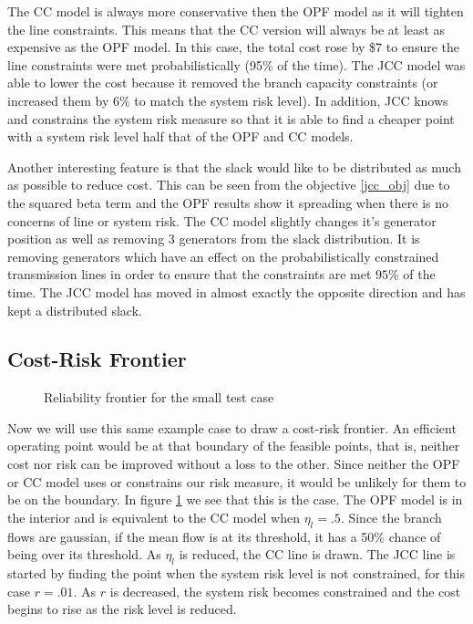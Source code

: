 The CC model is always more conservative then the OPF model as it will tighten the line constraints.  This means that the CC version will always be at least as expensive as the OPF model.  In this case, the total cost rose by \$7 to ensure the line constraints were met probabilistically (95\% of the time).  The JCC model was able to lower the cost because it removed the branch capacity constraints (or increased them by 6\% to match the system risk level).  In addition, JCC knows and constrains the system risk measure so that it is able to find a cheaper point with a system risk level half that of the OPF and CC models.



Another interesting feature is that the slack would like to be distributed as much as possible to reduce cost.  This can be seen from the objective \ref{jcc_obj} due to the squared beta term and the OPF results show it spreading when there is no concerns of line or system risk.  The CC model slightly changes it's generator position as well as removing 3 generators from the slack distribution.  It is removing generators which have an effect on the probabilistically constrained transmission lines in order to ensure that the constraints are met $95\%$ of the time.  The JCC model has moved in almost exactly the opposite direction and has kept a distributed slack.


\subsection{Cost-Risk Frontier}
  \begin{figure} 
\centering

\caption{Reliability frontier for the small test case}\label{costriskfront}
\end{figure}

Now we will use this same example case to draw a cost-risk frontier.  An efficient operating point would be at that boundary of the feasible points, that is, neither cost nor risk can be improved without a loss to the other.  Since neither the OPF or CC model uses or constrains our risk measure, it would be unlikely for them to be on the boundary.  In figure \ref{costriskfront} we see that this is the case.  The OPF model is in the interior and is equivalent to the CC model when $\eta_l=.5$.  Since the branch flows are gaussian, if the mean flow is at its threshold, it has a 50\% chance of being over its threshold.  As $\eta_l$ is reduced, the CC line is drawn.  The JCC line is started by finding the point when the system risk level is not constrained, for this case $r=.01$.  As $r$ is decreased, the system risk becomes constrained and the cost begins to rise as the risk level is reduced.


